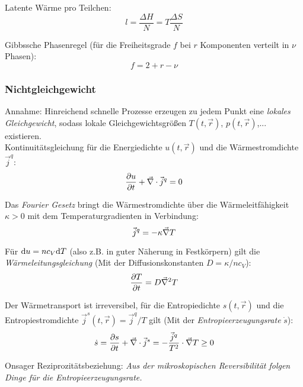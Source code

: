 			\noindent
			Latente Wärme pro Teilchen:
			\begin{equation}
				l = \frac{\Delta H}{N} = T\frac{\Delta S}{N}
			\end{equation}

			\noindent
			Gibbssche Phasenregel (für die Freiheitsgrade $f$ bei $r$ Komponenten verteilt in $\nu$ Phasen):
			\begin{equation}
				f = 2 + r - \nu
			\end{equation}

		\subsubsection{Nichtgleichgewicht}
			\noindent
			Annahme: Hinreichend schnelle Prozesse erzeugen zu jedem Punkt eine \emph{lokales Gleichgewicht}, sodass lokale Gleichgewichtsgrößen $T(t,\vec{r})$, $p(t,\vec{r})$,... existieren. \\
			Kontinuitätsgleichung für die Energiedichte $u(t,\vec{r})$ und die Wärmestromdichte $\vec{j}^q$:
			\begin{equation}
				\frac{\partial u}{\partial t} + \vec{\nabla}\cdot\vec{j}^q = 0
			\end{equation}

			\noindent
			Das \emph{Fourier Gesetz} bringt die Wärmestromdichte über die Wärmeleitfähigkeit $\kappa >0$ mit dem Temperaturgradienten in Verbindung:
			\begin{equation}
				\vec{j}^q = -\kappa \vec{\nabla} T
			\end{equation}

			\noindent
			Für $\mathrm{d} u = nc_V \mathrm{d} T$ (also z.B. in guter Näherung in Festkörpern) gilt die \emph{Wärmeleitungsgleichung} (Mit der Diffusionskonstanten $D=\kappa/nc_V$):
			\begin{equation}
				\frac{\partial T}{\partial t} = D\vec{\nabla}^2 T
			\end{equation}

			\noindent
			Der Wärmetransport ist irreversibel, für die Entropiedichte $s(t,\vec{r})$ und die Entropiestromdichte $\vec{j}^s (t,\vec{r}) = \vec{j}^q/T$ gilt (Mit der \emph{Entropieerzeugungsrate} $\dot{s}$):
			\begin{equation}
				\dot{s} = \frac{\partial s}{\partial t} + \vec{\nabla}\cdot\vec{j}^s = - \frac{\vec{j}^q}{T^2}\cdot\vec{\nabla} T \ge 0
			\end{equation}

			\noindent
			Onsager Reziprozitätsbeziehung:
			\newline\indent\emph{Aus der mikroskopischen Reversibilität folgen Dinge für die Entropieerzeugungsrate.}\vsp


